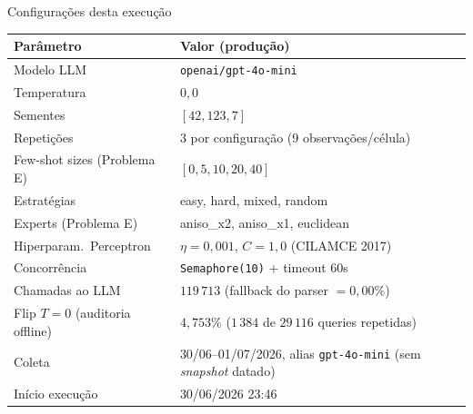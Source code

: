 \documentclass[aspectratio=169,10pt]{beamer}
\begin{document}
\begin{frame}{Configura\c{c}\~oes desta execu\c{c}\~ao}
  \footnotesize
  \begin{center}
  \begin{tabular}{ll}
    \toprule
    \textbf{Par\^ametro} & \textbf{Valor (produ\c{c}\~ao)} \\
    \midrule
    Modelo LLM & \texttt{openai/gpt-4o-mini} \\
    Temperatura & $0{,}0$ \\
    Sementes & $[42, 123, 7]$ \\
    Repeti\c{c}\~oes & 3 por configura\c{c}\~ao (9 observa\c{c}\~oes/c\'elula) \\
    Few-shot sizes (Problema E) & $[0, 5, 10, 20, 40]$ \\
    Estrat\'egias & easy, hard, mixed, random \\
    Experts (Problema E) & aniso\_x2, aniso\_x1, euclidean \\
    Hiperparam.\ Perceptron & $\eta=0{,}001$, $C=1{,}0$ (CILAMCE 2017) \\
    Concorr\^encia & \texttt{Semaphore(10)} + timeout 60s \\
    Chamadas ao LLM & $119\,713$ (fallback do parser $=0{,}00\%$) \\
    Flip $T{=}0$ (auditoria offline) & $4{,}753\%$ ($1\,384$ de $29\,116$ queries repetidas) \\
    Coleta & 30/06--01/07/2026, alias \texttt{gpt-4o-mini} (sem \emph{snapshot} datado) \\
    In\'icio execu\c{c}\~ao & 30/06/2026 23:46 \\
    \bottomrule
  \end{tabular}
  \end{center}
\end{frame}
\end{document}
